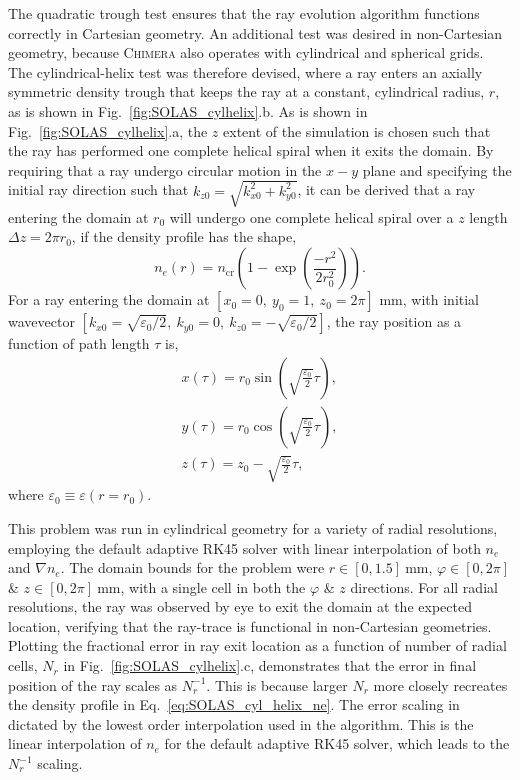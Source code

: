 The quadratic trough test ensures that the ray evolution algorithm functions correctly in Cartesian geometry.
An additional test was desired in non-Cartesian geometry, because \textsc{Chimera} also operates with cylindrical and spherical grids.
The cylindrical-helix test was therefore devised, where a ray enters an axially symmetric density trough that keeps the ray at a constant, cylindrical radius, $r$, as is shown in Fig.~\ref{fig:SOLAS_cylhelix}.b.
As is shown in Fig.~\ref{fig:SOLAS_cylhelix}.a, the $z$ extent of the simulation is chosen such that the ray has performed one complete helical spiral when it exits the domain.
By requiring that a ray undergo circular motion in the $x-y$ plane and specifying the initial ray direction such that $k_{z0}=\sqrt{k_{x0}^2+k_{y0}^2}$, it can be derived that a ray entering the domain at $r_0$ will undergo one complete helical spiral over a $z$ length $\Delta z= 2\pi r_0$, if the density profile has the shape,
\begin{equation}
    \label{eq:SOLAS_cyl_helix_ne}
    n_e(r) = n_{\text{cr}} \left( 1-\exp{\left( \frac{-r^2}{2r_0^2} \right)} \right).
\end{equation}
For a ray entering the domain at $[x_0=0,\ y_0=1,\ z_0=2\pi]$ mm, with initial wavevector $[k_{x0}=\sqrt{\varepsilon_0/2},\ k_{y0}=0,\ k_{z0}=-\sqrt{\varepsilon_0/2}]$, the ray position as a function of path length $\tau$ is,
\begin{equation}
    \begin{gathered}
        x(\tau) = r_0\sin{\left( \sqrt{\frac{\varepsilon_0}{2}}\tau \right)}, \\
        y(\tau) = r_0\cos{\left( \sqrt{\frac{\varepsilon_0}{2}}\tau \right)}, \\
        z(\tau) = z_0 - \sqrt{\frac{\varepsilon_0}{2}}\tau,
    \end{gathered}
\end{equation}
where $\varepsilon_0\equiv\varepsilon(r=r_0)$.

This problem was run in cylindrical geometry for a variety of radial resolutions, employing the default adaptive RK45 solver with linear interpolation of both $n_e$ and $\nabla n_e$.
The domain bounds for the problem were $r \in [0,1.5]\ \text{mm}$, $\varphi \in [0,2\pi]$ \& $z \in [0,2\pi]\ \text{mm}$, with a single cell in both the $\varphi$ \& $z$ directions.
For all radial resolutions, the ray was observed by eye to exit the domain at the expected location, verifying that the ray-trace is functional in non-Cartesian geometries.
Plotting the fractional error in ray exit location as a function of number of radial cells, $N_r$ in Fig.~\ref{fig:SOLAS_cylhelix}.c, demonstrates that the error in final position of the ray scales as $N_r^{-1}$.
This is because larger $N_r$ more closely recreates the density profile in Eq.~\ref{eq:SOLAS_cyl_helix_ne}.
The error scaling in dictated by the lowest order interpolation used in the algorithm.
This is the linear interpolation of $n_e$ for the default adaptive RK45 solver, which leads to the $N_r^{-1}$ scaling.

